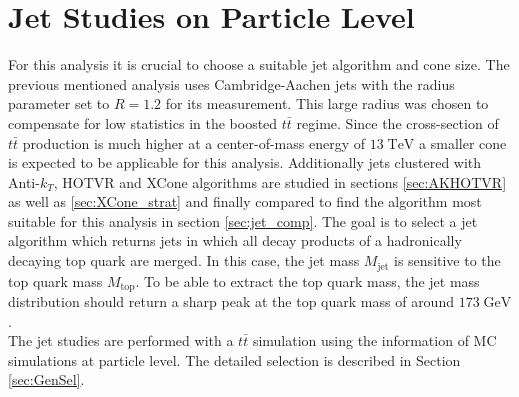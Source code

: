 \section{Jet Studies on Particle Level}
\label{sec:jet_studies}
	For this analysis it is crucial to choose a suitable jet algorithm and cone size. The previous mentioned analysis \cite{torben_paper} uses Cambridge-Aachen jets with the radius parameter set to $R=1.2$ for its measurement. This large radius was chosen to compensate for low statistics in the boosted $t\bar{t}$ regime. Since the cross-section of $t\bar{t}$ production is much higher at a center-of-mass energy of $13\;\text{TeV}$ a smaller cone is expected to be applicable for this analysis. Additionally jets clustered with Anti-$k_T$, HOTVR and XCone algorithms are studied in sections \ref{sec:AKHOTVR} as well as \ref{sec:XCone_strat} and finally compared to find the algorithm most suitable for this analysis in section \ref{sec:jet_comp}. The goal is to select a jet algorithm which returns jets in which all decay products of a hadronically decaying top quark are merged. In this case, the jet mass $M_\text{jet}$ is sensitive to the top quark mass $M_\text{top}$. To be able to extract the top quark mass, the jet mass distribution should return a sharp peak at the top quark mass of around $173\;\text{GeV}$.
	\\
	The jet studies are performed with a $t\bar{t}$ simulation using the information of MC simulations at particle level. The detailed selection is described in Section \ref{sec:GenSel}.

